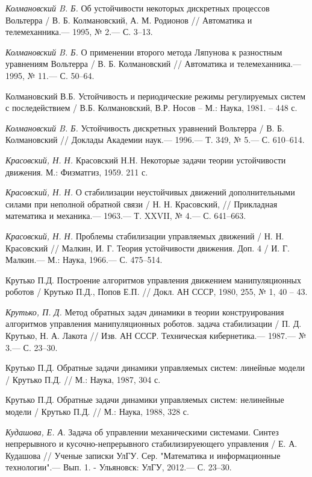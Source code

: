 \begin{thebibliography}{10}
	{\it Колмановский B. Б.} Об устойчивости некоторых дискретных процессов Вольтерра / В. Б. Колмановский, А. М. Родионов // Автоматика и телемеханника.— 1995, № 2.— С. 3–13.
	
	{\it Колмановский B. Б.} О применении второго метода Ляпунова к разностным уравнениям Вольтерра / В. Б. Колмановский // Автоматика и телемеханника.— 1995, № 11.— С. 50–64.
	
	Колмановский В.Б. Устойчивость и периодические режимы регулируемых систем с последействием / В.Б. Колмановский, В.Р. Носов – М.: Наука, 1981. – 448 с.
	
	{\it Колмановский B. Б.} Устойчивость дискретных уравнений Вольтерра / В. Б. Колмановский // Доклады Академии наук.— 1996.— Т. 349, № 5.— С. 610–614.
	
	{\it Красовский, Н. Н.} Красовский Н.Н. Некоторые задачи теории устойчивости движения. М.:
	Физматгиз, 1959. 211 с.
	
	{\it Красовский, Н. Н.} О стабилизации неустойчивых движений дополнительными силами при неполной обратной связи / Н. Н. Красовский,
	// Прикладная математика и механика.— 1963.— Т. XXVII, № 4.— С. 641–663.
	
	{\it Красовский, Н. Н.} Проблемы стабилизации управляемых движений / Н. Н. Красовский
	// Малкин, И. Г. Теория устойчивости движения. Доп. 4 / И. Г. Малкин.— М.:
	Наука, 1966.— С. 475–514.
	
	Крутько П.Д. Построение алгоритмов управления движением манипуляционных роботов / Крутько П.Д., Попов Е.П. // Докл. АН СССР, 1980, 255, № 1, 40 – 43.
	
	{\it Крутько, П. Д.} Метод обратных задач динамики в теории конструирования алгоритмов
	управления манипуляционных роботов. задача стабилизации / П. Д. Крутько, Н. А. Лакота
	// Изв. АН СССР. Техническая кибернетика.— 1987.— № 3.— С. 23–30.
	
	Крутько П.Д. Обратные задачи динамики управляемых систем: линейные модели / Крутько П.Д. // М.: Наука, 1987, 304 с.
	
	Крутько П.Д. Обратные задачи динамики управляемых систем: нелинейные модели / Крутько П.Д. // М.: Наука, 1988, 328 с.
	
	{\it Кудашова, Е. А.} Задача об управлении механическими системами. Синтез непрерывного и кусочно-непрерывного стабилизируеющего управления / Е. А. Кудашова // Ученые записки УлГУ. Сер. "Математика и информационные технологии".— Вып. 1. - Ульяновск: УлГУ, 2012.— С. 23–30.
	

\end{thebibliography}
